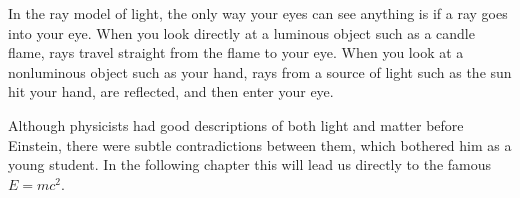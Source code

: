 
In the ray model of light, the only way your eyes can see anything is if a ray goes into your eye.
When you look directly at a luminous object such as a candle flame, rays travel straight from the flame to your eye.
When you look at a nonluminous object such as your hand, rays from a source of light such as the sun hit your hand,
are reflected, and then enter your eye.

Although physicists had good descriptions of both light and matter before Einstein,
there were subtle contradictions between them, which bothered him as a young student. In the following chapter this
will lead us directly to the famous $E=mc^2$.
